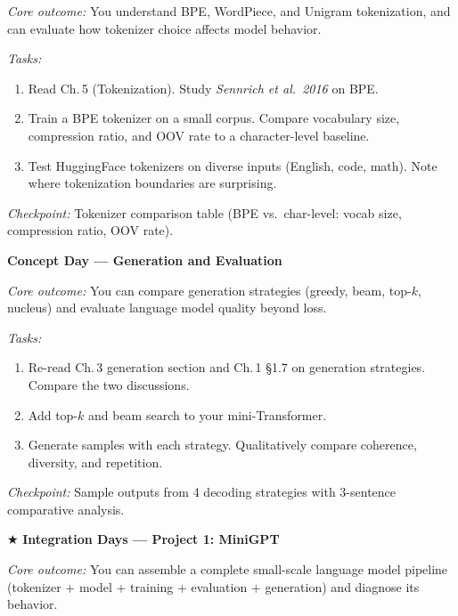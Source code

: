 \begin{description}[style=nextline, leftmargin=1.8cm, labelwidth=1.5cm]
\textit{Core outcome:} You understand BPE, WordPiece, and Unigram tokenization, and can evaluate how tokenizer choice affects model behavior.

\textit{Tasks:}
\begin{enumerate}
    \item Read Ch.\,5 (Tokenization). Study \emph{Sennrich et al.\ 2016} on BPE.
    \item Train a BPE tokenizer on a small corpus. Compare vocabulary size, compression ratio, and OOV rate to a character-level baseline.
    \item Test HuggingFace tokenizers on diverse inputs (English, code, math). Note where tokenization boundaries are surprising.
\end{enumerate}

\textit{Checkpoint:} Tokenizer comparison table (BPE vs.\ char-level: vocab size, compression ratio, OOV rate).


\item[Day 8] \textbf{Concept Day --- Generation and Evaluation}

\textit{Core outcome:} You can compare generation strategies (greedy, beam, top-$k$, nucleus) and evaluate language model quality beyond loss.

\textit{Tasks:}
\begin{enumerate}
    \item Re-read Ch.\,3 generation section and Ch.\,1 \S1.7 on generation strategies. Compare the two discussions.
    \item Add top-$k$ and beam search to your mini-Transformer.
    \item Generate samples with each strategy. Qualitatively compare coherence, diversity, and repetition.
\end{enumerate}

\textit{Checkpoint:} Sample outputs from 4 decoding strategies with 3-sentence comparative analysis.

\item[Day 9--10] $\bigstar$ \textbf{Integration Days --- Project 1: MiniGPT}

\textit{Core outcome:} You can assemble a complete small-scale language model pipeline (tokenizer + model + training + evaluation + generation) and diagnose its behavior.


\end{description}
